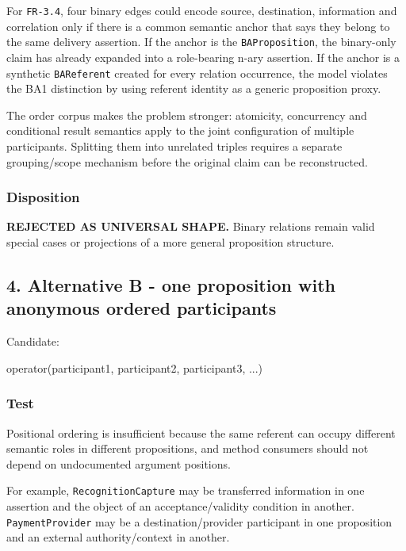 \documentclass[
  10pt,
  letterpaper,
]{article}
\newenvironment{Shaded}{}{}
\newcommand{\NormalTok}[1]{#1}
\begin{document}
For \texttt{FR-3.4}, four binary edges could encode source, destination,
information and correlation only if there is a common semantic anchor
that says they belong to the same delivery assertion. If the anchor is
the \texttt{BAProposition}, the binary-only claim has already expanded
into a role-bearing n-ary assertion. If the anchor is a synthetic
\texttt{BAReferent} created for every relation occurrence, the model
violates the BA1 distinction by using referent identity as a generic
proposition proxy.

The order corpus makes the problem stronger: atomicity, concurrency and
conditional result semantics apply to the joint configuration of
multiple participants. Splitting them into unrelated triples requires a
separate grouping/scope mechanism before the original claim can be
reconstructed.

\subsubsection{Disposition}\label{disposition}

\textbf{REJECTED AS UNIVERSAL SHAPE.} Binary relations remain valid
special cases or projections of a more general proposition structure.

\subsection{4. Alternative B - one proposition with anonymous ordered
participants}\label{alternative-b---one-proposition-with-anonymous-ordered-participants}

Candidate:

\begin{Shaded}
\begin{Highlighting}[]
\NormalTok{operator(participant1, participant2, participant3, ...)}
\end{Highlighting}
\end{Shaded}

\subsubsection{Test}\label{test-1}

Positional ordering is insufficient because the same referent can occupy
different semantic roles in different propositions, and method consumers
should not depend on undocumented argument positions.

For example, \texttt{RecognitionCapture} may be transferred information
in one assertion and the object of an acceptance/validity condition in
another. \texttt{PaymentProvider} may be a destination/provider
participant in one proposition and an external authority/context in
another.
\end{document}
